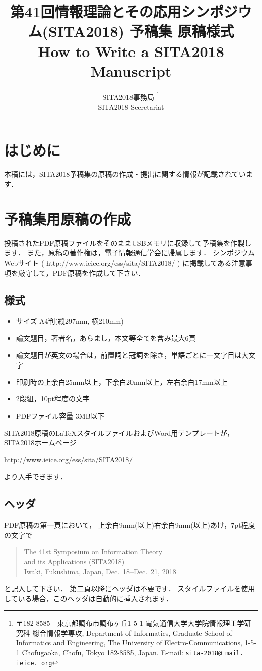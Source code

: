\documentclass{jarticle}
\title{
  第41回情報理論とその応用シンポジウム(SITA2018) 予稿集 原稿様式\\
  How to Write a SITA2018 Manuscript
}
\author{
  SITA2018事務局
  \thanks{ %
  〒182-8585　東京都調布市調布ヶ丘1-5-1 電気通信大学大学院情報理工学研究科  総合情報学専攻, 
  Department of Informatics, 
  Graduate School of Informatics and Engineering, 
  The University of Electro-Communications, 
  1-5-1 Chofugaoka, Chofu, Tokyo 182-8585, Japan. 
  E-mail: {\tt sita-2018@\allowbreak
  mail.\allowbreak
  ieice.\allowbreak
  org}
  }\\
  SITA2018 Secretariat
}
\begin{document}
\maketitle

\section{はじめに}

本稿には，SITA2018予稿集の原稿の作成・提出に関する情報が記載されています．

\section{予稿集用原稿の作成}

投稿されたPDF原稿ファイルをそのままUSBメモリに収録して予稿集を作製します．
また，原稿の著作権は，電子情報通信学会に帰属します．
シンポジウムWebサイト
( http://www.ieice.org/ess/sita/SITA2018/ )
に掲載してある注意事項を厳守して，PDF原稿を作成して下さい．

\subsection{様式}

\begin{itemize}
\item サイズ A4判(縦297mm, 横210mm)
\item 論文題目，著者名，あらまし，本文等全てを含み最大6頁
\item 論文題目が英文の場合は，前置詞と冠詞を除き，単語ごとに一文字目は大文字
\item 印刷時の上余白25mm以上，下余白20mm以上，左右余白17mm以上
\item 2段組，10pt程度の文字
\item PDFファイル容量 3MB以下
\end{itemize}
SITA2018原稿の\LaTeX スタイルファイルおよびWord用テンプレートが，SITA2018ホームページ
\begin{center}
http://www.ieice.org/ess/sita/SITA2018/
\end{center}
より入手できます．

\subsection{へッダ}

PDF原稿の第一頁において，
上余白9mm(以上)右余白9mm(以上)あけ，7pt程度の文字で

\begin{quotation}
{\footnotesize
\noindent The 41st Symposium on Information Theory\\
and its Applications (SITA2018)\\
Iwaki, Fukushima, Japan, Dec.\ 18--Dec.\ 21, 2018
}
\end{quotation}
と記入して下さい．
第二頁以降にヘッダは不要です．
スタイルファイルを使用している場合，このへッダは自動的に挿入されます．
\end{document}
